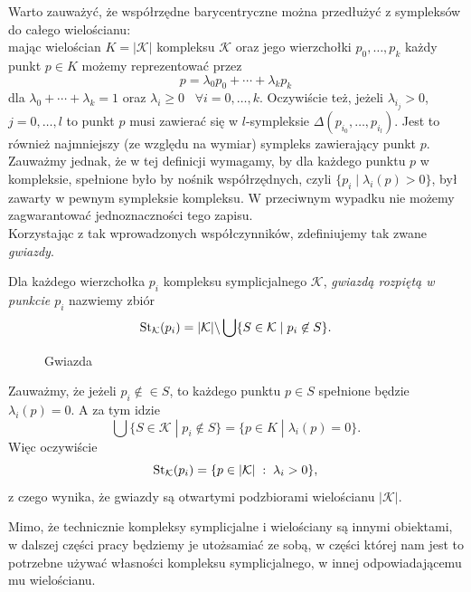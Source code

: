 Warto zauważyć, że współrzędne barycentryczne można przedłużyć z sympleksów do całego wielościanu:\\ mając wielościan $K=|\mathcal{K}|$ kompleksu $\mathcal{K}$ oraz jego wierzchołki $p_0, \ldots, p_k$ każdy punkt $p\in K$ możemy reprezentować przez
\[p=\lambda_0 p_0+\cdots +\lambda_k p_k\]
dla $\lambda_0 +\cdots +\lambda_k=1$ oraz $\lambda_i\ge 0\;\;\; \forall i=0, \ldots, k$.
Oczywiście też, jeżeli $\lambda_{i_j}>0$, $j=0, \ldots, l$ to punkt $p$ musi zawierać się w $l$-sympleksie $\Delta(p_{i_0}, \ldots, p_{i_l})$.  
Jest to również najmniejszy (ze względu na wymiar) sympleks zawierający punkt $p$.\\
Zauważmy jednak, że w tej definicji wymagamy, by dla każdego punktu $p$ w kompleksie, spełnione było by nośnik współrzędnych, czyli $\{p_i \;|\; \lambda_i(p)>0\}$, był zawarty w pewnym sympleksie kompleksu. W przeciwnym wypadku nie możemy zagwarantować jednoznaczności tego zapisu.\\
Korzystając z tak wprowadzonych współczynników, zdefiniujemy tak zwane \emph{gwiazdy}.

\begin{defi}
    Dla każdego wierzchołka $p_i$ kompleksu symplicjalnego $\mathcal{K}$, \emph{gwiazdą rozpiętą w punkcie $p_i$} nazwiemy zbiór
    \[
     \operatorname{St}_{\mathcal{K}}(p_i) = 
     |\mathcal{K}| \backslash \bigcup\{ S\in \mathcal{K}\;|\;p_i\not \in S\}.
    \]
    \begin{figure}[H]
        \centering
        
        \caption{Gwiazda}
        \label{fig:gwiazda}
    \end{figure}
\end{defi}
Zauważmy, że jeżeli $p_i\not \in \in S$, to każdego punktu $p\in S$ spełnione będzie $\lambda_i(p) = 0$. A za tym idzie 
\[
    \bigcup\{ S\in \mathcal{K}\;|\;p_i\not \in S\} = 
    \{ p\in K \;|\; \lambda_i(p)=0\}.
\]
Więc oczywiście
\[
\operatorname{St}_{\mathcal{K}}(p_i) =
     \{ p\in |\mathcal{K}|\;:\;\lambda_i>0\},
\]
z czego wynika, że gwiazdy są otwartymi podzbiorami wielościanu $|\mathcal{K}|$.

Mimo, że technicznie kompleksy symplicjalne i wielościany są innymi obiektami, w dalszej części pracy będziemy je utożsamiać ze sobą, w części której nam jest to potrzebne używać własności kompleksu symplicjalnego, w innej odpowiadającemu mu wielościanu.
